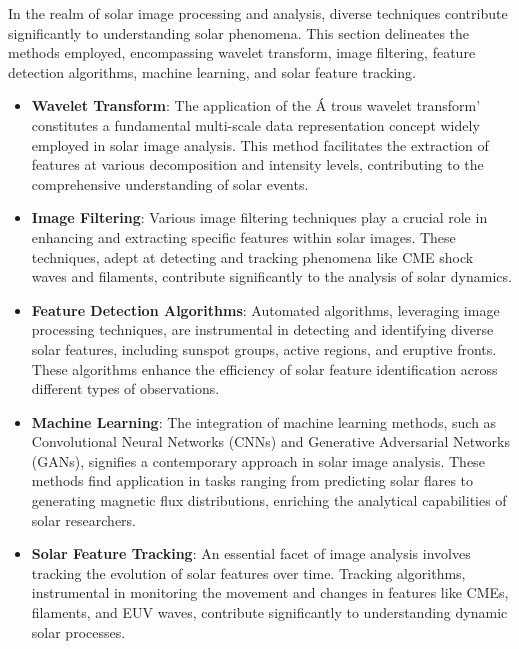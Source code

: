 In the realm of solar image processing and analysis, diverse techniques contribute significantly to understanding solar phenomena. This section delineates the methods employed, encompassing wavelet transform, image filtering, feature detection algorithms, machine learning, and solar feature tracking.

\begin{itemize}
	\item \textbf{Wavelet Transform}:
	The application of the \'A trous wavelet transform' constitutes a fundamental multi-scale data representation concept widely employed in solar image analysis. This method facilitates the extraction of features at various decomposition and intensity levels, contributing to the comprehensive understanding of solar events.
	
	\item \textbf{Image Filtering}:
	Various image filtering techniques play a crucial role in enhancing and extracting specific features within solar images. These techniques, adept at detecting and tracking phenomena like CME shock waves and filaments, contribute significantly to the analysis of solar dynamics.
	
	\item \textbf{Feature Detection Algorithms}:
	Automated algorithms, leveraging image processing techniques, are instrumental in detecting and identifying diverse solar features, including sunspot groups, active regions, and eruptive fronts. These algorithms enhance the efficiency of solar feature identification across different types of observations.
	
	\item \textbf{Machine Learning}:
	The integration of machine learning methods, such as Convolutional Neural Networks (CNNs) and Generative Adversarial Networks (GANs), signifies a contemporary approach in solar image analysis. These methods find application in tasks ranging from predicting solar flares to generating magnetic flux distributions, enriching the analytical capabilities of solar researchers.
	
	\item \textbf{Solar Feature Tracking}:
	An essential facet of image analysis involves tracking the evolution of solar features over time. Tracking algorithms, instrumental in monitoring the movement and changes in features like CMEs, filaments, and EUV waves, contribute significantly to understanding dynamic solar processes.
\end{itemize}

